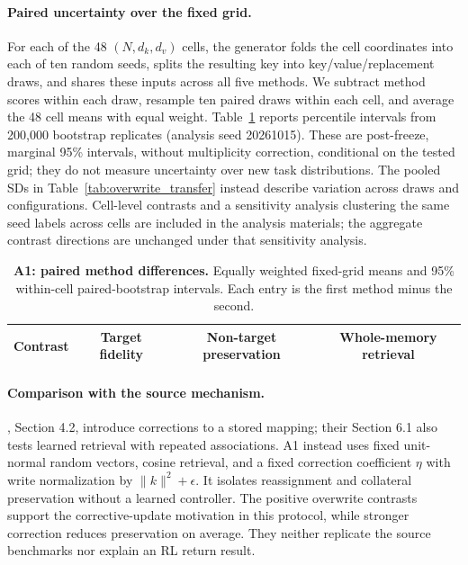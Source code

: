 \paragraph{Paired uncertainty over the fixed grid.}
For each of the 48 $(N,d_k,d_v)$ cells, the generator folds the cell coordinates into each of ten random seeds, splits the resulting key into key/value/replacement draws, and shares these inputs across all five methods. We subtract method scores within each draw, resample ten paired draws within each cell, and average the 48 cell means with equal weight. Table~\ref{tab:overwrite_contrasts} reports percentile intervals from 200,000 bootstrap replicates (analysis seed 20261015). These are post-freeze, marginal 95\% intervals, without multiplicity correction, conditional on the tested grid; they do not measure uncertainty over new task distributions. The pooled SDs in Table~\ref{tab:overwrite_transfer} instead describe variation across draws and configurations. Cell-level contrasts and a sensitivity analysis clustering the same seed labels across cells are included in the analysis materials; the aggregate contrast directions are unchanged under that sensitivity analysis.

\begin{table}[ht]
\centering\small
\setlength{\tabcolsep}{4pt}
\caption{\textbf{A1: paired method differences.} Equally weighted fixed-grid means and 95\% within-cell paired-bootstrap intervals. Each entry is the first method minus the second.}
\label{tab:overwrite_contrasts}
\begin{tabular}{lccc}
\toprule
Contrast & Target fidelity & Non-target preservation & Whole-memory retrieval \\
\midrule

\end{tabular}
\end{table}

\paragraph{Comparison with the source mechanism.}
\citet{schlag2021linear}, Section 4.2, introduce corrections to a stored mapping; their Section 6.1 also tests learned retrieval with repeated associations. A1 instead uses fixed unit-normal random vectors, cosine retrieval, and a fixed correction coefficient $\eta$ with write normalization by $\lVert k\rVert^2+\epsilon$. It isolates reassignment and collateral preservation without a learned controller. The positive overwrite contrasts support the corrective-update motivation in this protocol, while stronger correction reduces preservation on average. They neither replicate the source benchmarks nor explain an RL return result.

